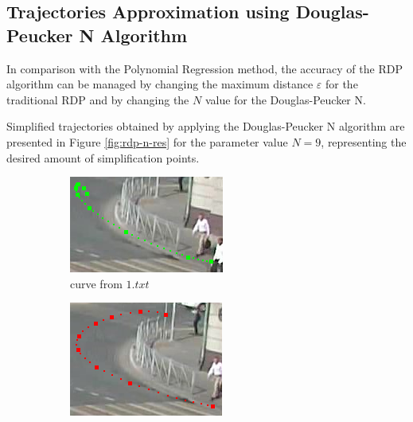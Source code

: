 \subsection{Trajectories Approximation using Douglas-Peucker N Algorithm}

In comparison with the Polynomial Regression method, the accuracy of the RDP algorithm can be managed by changing the maximum distance $\varepsilon$ for the traditional RDP and by changing the $N$ value for the Douglas-Peucker N. 

Simplified trajectories obtained by applying the Douglas-Peucker N algorithm are presented in Figure \ref{fig:rdp-n-res} for the parameter value $N = 9$, representing the desired amount of simplification points.

\begin{figure}[!htb]
	\begin{subfigure}[!htb]{0.32\textwidth}
		\centering{}
		\includegraphics[width=\textwidth]{images/rdp-n-curve-1.png}
		\caption{curve from $1.txt$}
	\end{subfigure}
	\hfill
	\begin{subfigure}[!htb]{0.32\textwidth}
		\centering{}
		\includegraphics[width=\textwidth]{images/rdp-n-turn.png}

\end{subfigure}
\end{figure}
